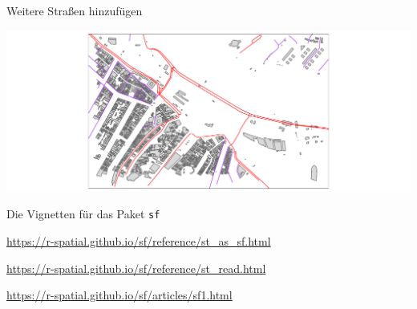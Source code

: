\documentclass[ignorenonframetext,]{beamer}
\newenvironment{Shaded}{\begin{snugshade}}{\end{snugshade}}
\newcommand{\KeywordTok}[1]{\textcolor[rgb]{0.13,0.29,0.53}{\textbf{#1}}}
\newcommand{\DataTypeTok}[1]{\textcolor[rgb]{0.13,0.29,0.53}{#1}}
\newcommand{\StringTok}[1]{\textcolor[rgb]{0.31,0.60,0.02}{#1}}
\newcommand{\OperatorTok}[1]{\textcolor[rgb]{0.81,0.36,0.00}{\textbf{#1}}}
\newcommand{\NormalTok}[1]{#1}
\begin{document}
\begin{frame}[fragile]{Weitere Straßen hinzufügen}

\begin{Shaded}
\end{Shaded}

\includegraphics{simplefeatures_files/figure-beamer/unnamed-chunk-30-1.pdf}

\end{frame}

\begin{frame}{Die Vignetten für das Paket \texttt{sf}}

\url{https://r-spatial.github.io/sf/reference/st_as_sf.html}

\url{https://r-spatial.github.io/sf/reference/st_read.html}

\url{https://r-spatial.github.io/sf/articles/sf1.html}

\end{frame}
\end{document}
